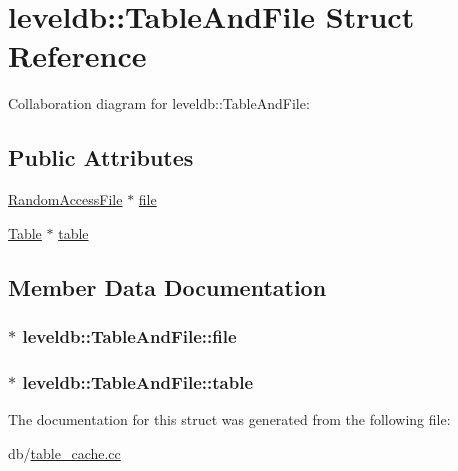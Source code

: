 \hypertarget{structleveldb_1_1_table_and_file}{\section{leveldb\-:\-:Table\-And\-File Struct Reference}
\label{structleveldb_1_1_table_and_file}
}


Collaboration diagram for leveldb\-:\-:Table\-And\-File\-:
\subsection*{Public Attributes}
\begin{DoxyCompactItemize}
\item 
\hyperlink{classleveldb_1_1_random_access_file}{Random\-Access\-File} $\ast$ \hyperlink{structleveldb_1_1_table_and_file_a7f1f72d4654e4ab49aab750330036edb}{file}
\item 
\hyperlink{classleveldb_1_1_table}{Table} $\ast$ \hyperlink{structleveldb_1_1_table_and_file_ab2df8b8a6c028cfcf36885fe76f48c99}{table}
\end{DoxyCompactItemize}


\subsection{Member Data Documentation}
\hypertarget{structleveldb_1_1_table_and_file_a7f1f72d4654e4ab49aab750330036edb}{
\subsubsection[{file}]{$\ast$ leveldb\-::\-Table\-And\-File\-::file}}\label{structleveldb_1_1_table_and_file_a7f1f72d4654e4ab49aab750330036edb}
\hypertarget{structleveldb_1_1_table_and_file_ab2df8b8a6c028cfcf36885fe76f48c99}{
\subsubsection[{table}]{$\ast$ leveldb\-::\-Table\-And\-File\-::table}}\label{structleveldb_1_1_table_and_file_ab2df8b8a6c028cfcf36885fe76f48c99}


The documentation for this struct was generated from the following file\-:\begin{DoxyCompactItemize}
\item 
db/\hyperlink{table__cache_8cc}{table\-\_\-cache.\-cc}\end{DoxyCompactItemize}
